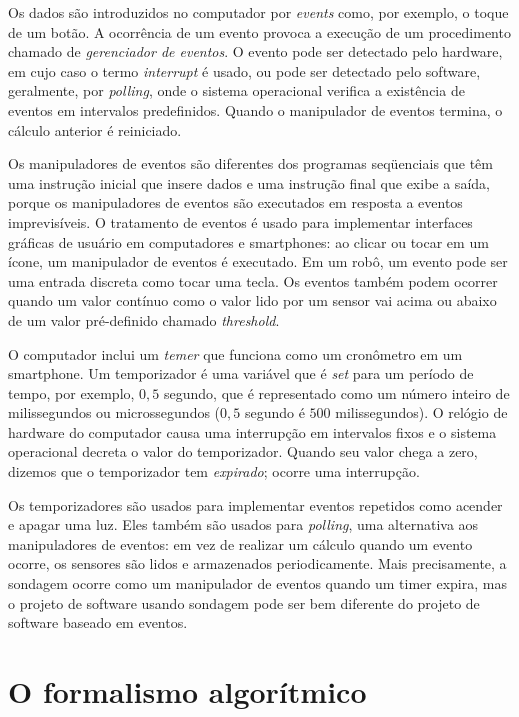 Os dados são introduzidos no computador por \emph{events} como, por exemplo, o toque de um botão. A ocorrência de um evento provoca a execução de um procedimento chamado de \emph{gerenciador de eventos}. O evento pode ser detectado pelo hardware, em cujo caso o termo \emph{interrupt} é usado, ou pode ser detectado pelo software, geralmente, por \emph{polling}, onde o sistema operacional verifica a existência de eventos em intervalos predefinidos. Quando o manipulador de eventos termina, o cálculo anterior é reiniciado.

Os manipuladores de eventos são diferentes dos programas seqüenciais que têm uma instrução inicial que insere dados e uma instrução final que exibe a saída, porque os manipuladores de eventos são executados em resposta a eventos imprevisíveis. O tratamento de eventos é usado para implementar interfaces gráficas de usuário em computadores e smartphones: ao clicar ou tocar em um ícone, um manipulador de eventos é executado. Em um robô, um evento pode ser uma entrada discreta como tocar uma tecla. Os eventos também podem ocorrer quando um valor contínuo como o valor lido por um sensor vai acima ou abaixo de um valor pré-definido chamado \emph{threshold}.

O computador inclui um \emph{temer} que funciona como um cronômetro em um smartphone. Um temporizador é uma variável que é \emph{set} para um período de tempo, por exemplo, $0,5$ segundo, que é representado como um número inteiro de milissegundos ou microssegundos ($0,5$ segundo é $500$ milissegundos). O relógio de hardware do computador causa uma interrupção em intervalos fixos e o sistema operacional decreta o valor do temporizador. Quando seu valor chega a zero, dizemos que o temporizador tem \emph{expirado}; ocorre uma interrupção.

Os temporizadores são usados para implementar eventos repetidos como acender e apagar uma luz. Eles também são usados para \emph{polling}, uma alternativa aos manipuladores de eventos: em vez de realizar um cálculo quando um evento ocorre, os sensores são lidos e armazenados periodicamente. Mais precisamente, a sondagem ocorre como um manipulador de eventos quando um timer expira, mas o projeto de software usando sondagem pode ser bem diferente do projeto de software baseado em eventos.

\section{O formalismo algorítmico}\label{s.alg-formalism}

